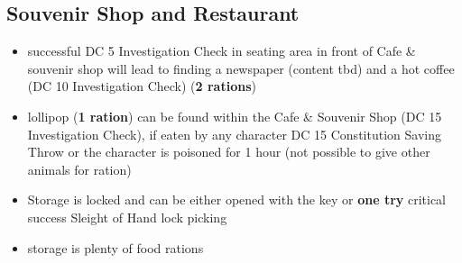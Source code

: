 \subsection*{ Souvenir Shop and Restaurant}
\begin{itemize}
	\item successful DC 5 Investigation Check in seating area in front of Cafe \& souvenir shop will lead to finding a newspaper (content tbd) and a hot coffee (DC 10 Investigation Check) (\textbf{2 rations})
	\item lollipop (\textbf{1 ration}) can be found within the Cafe \& Souvenir Shop (DC 15 Investigation Check), if eaten by any character DC 15 Constitution Saving Throw or the character is poisoned for 1 hour (not possible to give other animals for ration)
	\item Storage is locked and can be either opened with the key or \textbf{one try} critical success Sleight of Hand lock picking
	\item storage is plenty of food rations
\end{itemize}
